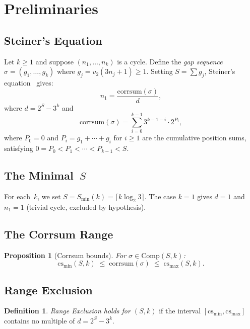 \documentclass[11pt,a4paper]{article}
\theoremstyle{plain}
\newtheorem{proposition}[theorem]{Proposition}
\theoremstyle{definition}
\newtheorem{definition}[theorem]{Definition}
\newcommand{\corr}{\mathrm{corrsum}}
\newcommand{\Comp}{\mathrm{Comp}}
\begin{document}
\section{Preliminaries}

\subsection{Steiner's Equation}

Let $k \geq 1$ and suppose $(n_1, \ldots, n_k)$ is a cycle. Define the \emph{gap sequence} $\sigma = (g_1, \ldots, g_k)$ where $g_j = v_2(3n_j + 1) \geq 1$. Setting $S = \sum g_j$, Steiner's equation~\cite{Steiner77} gives:
\begin{equation}\label{eq:steiner}
n_1 = \frac{\corr(\sigma)}{d},
\end{equation}
where $d = 2^S - 3^k$ and
\begin{equation}\label{eq:corrsum}
\corr(\sigma) = \sum_{i=0}^{k-1} 3^{k-1-i} \cdot 2^{P_i},
\end{equation}
where $P_0 = 0$ and $P_i = g_1 + \cdots + g_i$ for $i \geq 1$ are the cumulative position sums, satisfying $0 = P_0 < P_1 < \cdots < P_{k-1} < S$.

\subsection{The Minimal~$S$}

For each~$k$, we set $S = S_{\min}(k) = \lceil k \log_2 3 \rceil$. The case $k = 1$ gives $d = 1$ and $n_1 = 1$ (trivial cycle, excluded by hypothesis).

\subsection{The Corrsum Range}

\begin{proposition}[Corrsum bounds]\label{prop:bounds}
For $\sigma \in \Comp(S,k)$:
\[
\mathrm{cs_{min}}(S,k) \;\leq\; \corr(\sigma) \;\leq\; \mathrm{cs_{max}}(S,k).
\]
\end{proposition}

\subsection{Range Exclusion}

\begin{definition}
\emph{Range Exclusion holds for $(S,k)$} if the interval $[\mathrm{cs_{min}}, \mathrm{cs_{max}}]$ contains no multiple of $d = 2^S - 3^k$.
\end{definition}
\end{document}

